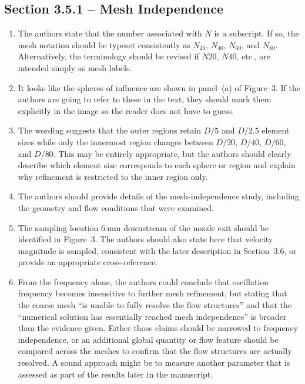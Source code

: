 \documentclass[11pt]{article}
\begin{document}
	
	\subsection*{Section 3.5.1 -- Mesh Independence}
	
	\begin{enumerate}
		\item The authors state that the number associated with $N$ is a subscript. If so, the mesh notation should be typeset consistently as $N_{20}$, $N_{40}$, $N_{60}$, and $N_{80}$. Alternatively, the terminology should be revised if $N20$, $N40$, etc., are intended simply as mesh labels.
		
		\item It looks like the spheres of influence are shown in panel~(a) of Figure~3. If the authors are going to refer to these in the text, they should mark them explicitly in the image so the reader does not have to guess.
		
		\item The wording suggests that the outer regions retain $D/5$ and $D/2.5$ element sizes while only the innermost region changes between $D/20$, $D/40$, $D/60$, and $D/80$. This may be entirely appropriate, but the authors should clearly describe which element size corresponds to each sphere or region and explain why refinement is restricted to the inner region only.
		
		\item The authors should provide details of the mesh-independence study, including the geometry and flow conditions that were examined.
		
		\item The sampling location $6~\mathrm{mm}$ downstream of the nozzle exit should be identified in Figure~3. The authors should also state here that velocity magnitude is sampled, consistent with the later description in Section~3.6, or provide an appropriate cross-reference.
		
		\item From the frequency alone, the authors could conclude that oscillation frequency becomes insensitive to further mesh refinement, but stating that the coarse mesh ``is unable to fully resolve the flow structures'' and that the ``numerical solution has essentially reached mesh independence'' is broader than the evidence given. Either those claims should be narrowed to frequency independence, or an additional global quantity or flow feature should be compared across the meshes to confirm that the flow structures are actually resolved. A sound approach might be to measure another parameter that is assessed as part of the results later in the manuscript.
		

\end{enumerate}
\end{document}
